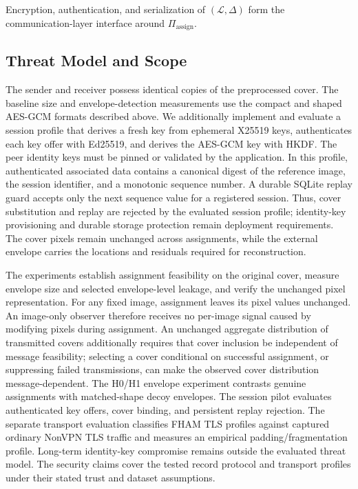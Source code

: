 \documentclass[preprint,12pt]{elsarticle}
\theoremstyle{plain}
\begin{document}
Encryption, authentication, and serialization of $(\mathcal{L},\Delta)$ form
the communication-layer interface around $\Pi_{\mathrm{assign}}$.

\subsection{Threat Model and Scope}

The sender and receiver possess identical copies of the preprocessed cover.
The baseline size and envelope-detection measurements use the compact and
shaped AES-GCM formats described above. We additionally implement and
evaluate a session profile that derives a fresh key from ephemeral X25519
keys, authenticates each key offer with Ed25519, and derives the AES-GCM key
with HKDF. The peer identity keys must be pinned or validated by the
application. In this profile, authenticated associated data contains a
canonical digest of the reference image, the session identifier, and a
monotonic sequence number. A durable SQLite replay guard accepts only the
next sequence value for a registered session. Thus, cover substitution and
replay are rejected by the evaluated session profile; identity-key
provisioning and durable storage protection remain deployment requirements.
The cover pixels remain unchanged across assignments, while the external
envelope carries the locations and residuals required for reconstruction.

The experiments establish assignment feasibility on the original cover,
measure envelope size and selected envelope-level leakage, and verify the
unchanged pixel representation. For any fixed image, assignment leaves its
pixel values unchanged. An image-only observer therefore receives no
per-image signal caused by modifying pixels during assignment. An unchanged
aggregate distribution of transmitted covers additionally requires that
cover inclusion be independent of message feasibility; selecting a cover
conditional on successful assignment, or suppressing failed transmissions,
can make the observed cover distribution message-dependent. The H0/H1 envelope
experiment contrasts genuine assignments with matched-shape decoy envelopes.
The session pilot evaluates authenticated key offers, cover binding, and
persistent replay rejection. The separate transport evaluation classifies
FHAM TLS profiles against captured ordinary NonVPN TLS traffic and measures an
empirical padding/fragmentation profile. Long-term identity-key compromise
remains outside the evaluated threat model. The security claims cover the
tested record protocol and transport profiles under their stated trust and
dataset assumptions.
\end{document}
